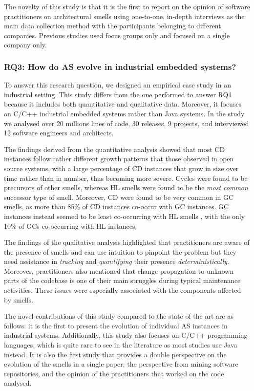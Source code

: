 The novelty of this study is that it is the first to report on the opinion of software practitioners on architectural smells using one-to-one, in-depth interviews as the main data collection method with the participants belonging to different companies. Previous studies used focus groups only and focused on a single company only.

\subsubsection*{RQ3: How do AS evolve in industrial embedded systems?}
To answer this research question, we designed an empirical case study in an industrial setting.
This study differs from the one performed to answer RQ1 because it includes both quantitative and qualitative data. Moreover, it focuses on C/C++ industrial embedded systems rather than Java systems.
In the study we analysed over 20 millions lines of code, 30 releases, 9 projects, and interviewed 12 software engineers and architects.

The findings derived from the quantitative analysis showed that most CD instances follow rather different growth patterns that those observed in open source systems, with a large percentage of CD instances that grow in size over time rather than in number, thus becoming more severe.
Cycles were found to be precursors of other smells, whereas HL smells were found to be the \emph{most common} successor type of smell.
Moreover, CD were found to be very common in GC smells, as more than 85\% of CD instances co-occur with GC instances.
GC instances instead seemed to be least co-occurring with HL smells , with the only 10\% of GCs co-occurring with HL instances.

The findings of the qualitative analysis highlighted that practitioners are aware of the presence of smells and can use intuition to pinpoint the problem but they need assistance in \emph{tracking} and \emph{quantifying} their presence \emph{deterministically}.
Moreover, practitioners also mentioned that change propagation to unknown parts of the codebase is one of their main struggles during typical maintenance activities.
These issues were especially associated with the components affected by smells. 

The novel contributions of this study compared to the state of the art are as follows: it is the first to present the evolution of individual AS instances in industrial systems. Additionally, this study also focuses on C/C++ programming languages, which is quite rare to see in the literature as most studies use Java instead.
It is also the first study that provides a double perspective on the evolution of the smells in a single paper: the perspective from mining software repositories, and the opinion of the practitioners that worked on the code analysed.

